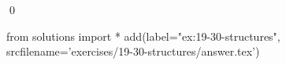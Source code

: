 
\begin{ex}
  \label{ex:19-30-structures}
  
  \qed
\end{ex}
\begin{python0}
from solutions import *
add(label="ex:19-30-structures",
    srcfilename='exercises/19-30-structures/answer.tex')
\end{python0}
